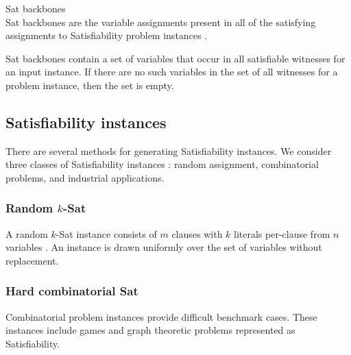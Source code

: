 \begin{definition}
{\sc Sat} backbones\\
{\sc Sat} backbones are the variable assignments present in all of the satisfying assignments to {\sc Satisfiability} problem instances \cite{Zhang2001}. 

\end{definition}

{\sc Sat} backbones contain a set of variables that occur in all satisfiable witnesses for an input instance.  If there are no such variables in the set of all witnesses for a problem instance, then the set is empty.

	\subsection{{\sc Satisfiability} instances}
		
There are several methods for generating {\sc Satisfiability} instances.  We consider three classes of {\sc Satisfiability} instances \cite{satcompetition}: random assignment, combinatorial problems, and industrial applications.
	
\subsubsection{Random $k$-{\sc Sat}}
A random $k$-{\sc Sat} instance consists of $m$ clauses with $k$ literals per-clause from $n$ variables \cite{wilsonKsat}.  An instance is drawn uniformly over the set of variables without replacement.

		

\subsubsection{Hard combinatorial {\sc Sat}}

Combinatorial problem instances provide difficult benchmark cases.  These instances include games and graph theoretic problems represented as {\sc Satisfiability}. 
		
